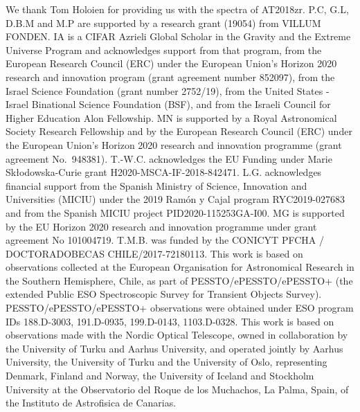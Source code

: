 \documentclass[structabstract]{aa}
\begin{document}
\begin{acknowledgements}

We thank Tom Holoien for providing us with the spectra of AT2018zr. P.C, G.L, D.B.M and M.P are supported by a research grant (19054)
from VILLUM FONDEN. IA is a CIFAR Azrieli Global Scholar in the Gravity and the Extreme Universe Program and acknowledges support from that program, from the European Research Council (ERC) under the European Union’s Horizon 2020 research and innovation program (grant agreement number 852097), from the Israel Science Foundation (grant number 2752/19), from the United States - Israel Binational Science Foundation (BSF), and from the Israeli Council for Higher Education Alon Fellowship. MN is supported by a Royal Astronomical Society Research Fellowship and by the European Research Council (ERC) under the European Union’s Horizon 2020 research and innovation programme (grant agreement No.~948381). T.-W.C. acknowledges the EU Funding under Marie Sk\l{}odowska-Curie grant H2020-MSCA-IF-2018-842471. L.G. acknowledges financial support from the Spanish Ministry of Science, Innovation and Universities (MICIU) under the 2019 Ram\'on y Cajal program RYC2019-027683 and from the Spanish MICIU project PID2020-115253GA-I00. MG is supported by the EU Horizon 2020 research and innovation programme under grant agreement No 101004719. T.M.B. was funded by the CONICYT PFCHA / DOCTORADOBECAS CHILE/2017-72180113. This work is based on observations collected at the European Organisation for Astronomical Research in the Southern Hemisphere, Chile, as part of PESSTO/ePESSTO/ePESSTO+ (the extended Public ESO Spectroscopic Survey for Transient Objects Survey). PESSTO/ePESSTO/ePESSTO+ observations were obtained under ESO program IDs 188.D-3003, 191.D-0935, 199.D-0143, 1103.D-0328. This work is based on observations made with the Nordic Optical Telescope, owned in collaboration by the University of Turku and Aarhus University, and operated jointly by Aarhus University, the University of Turku and the University of Oslo, representing Denmark, Finland and Norway, the University of Iceland and Stockholm University at the Observatorio del Roque de los Muchachos, La Palma, Spain, of the Instituto de Astrofisica de Canarias.


\end{acknowledgements}






\appendix{}
\onecolumn
\centering
\end{document}
